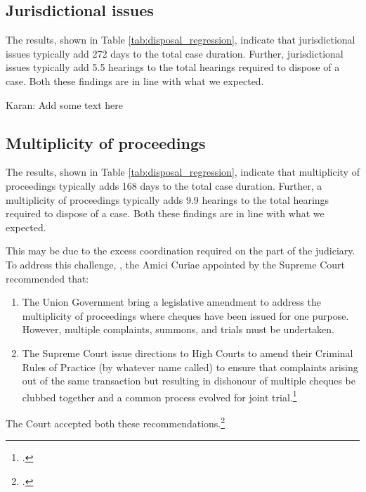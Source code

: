 \documentclass[12pt,a4paper]{article}
\begin{document}
\subsection{Jurisdictional issues}
\label{sec:jurisd-issu}

The results, shown in Table \ref{tab:disposal_regression}, indicate that jurisdictional issues typically add 272 days to the total case duration. Further, jurisdictional issues typically add 5.5 hearings to the total hearings required to dispose of a case. Both these findings are in line with what we expected.

{\color{red}Karan: Add some text here}

\subsection{Multiplicity of proceedings}
\label{sec:mult-proc}

The results, shown in Table \ref{tab:disposal_regression}, indicate that multiplicity of proceedings typically adds 168 days to the total case duration. Further, a multiplicity of proceedings typically adds 9.9 hearings to the total hearings required to dispose of a case. Both these findings are in line with what we expected.

This may be due to the excess coordination required on the part of the judiciary. To address this challenge, , the Amici Curiae appointed by the Supreme Court recommended that:

\begin{enumerate}
\item The Union Government bring a legislative amendment to address the multiplicity of proceedings where cheques have been issued for one purpose. However, multiple complaints, summons, and trials must be undertaken.
\item The Supreme Court issue directions to High Courts to amend their Criminal Rules of Practice (by whatever name called) to ensure that complaints arising out of the same transaction but resulting in dishonour of multiple cheques be clubbed together and a common process evolved for joint trial.\footcite{amicus2020_submission}
\end{enumerate}

The Court accepted both these recommendations.\footcite{sc2020_138}
\end{document}
